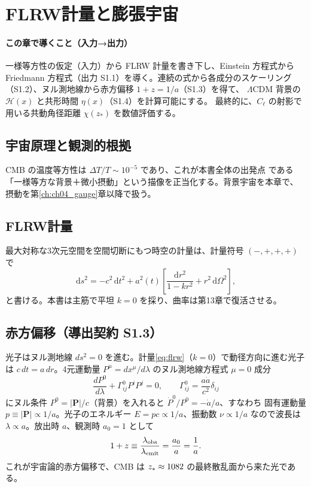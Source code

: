 \section{FLRW計量と膨張宇宙}
\label{ch:ch01_introduction}

\paragraph{この章で導くこと（入力→出力）}
一様等方性の仮定（入力）から FLRW 計量を書き下し、Einstein 方程式から
Friedmann 方程式（出力 S1.1）を導く。連続の式から各成分のスケーリング
（S1.2）、ヌル測地線から赤方偏移 $1+z=1/a$（S1.3）を得て、
$\Lambda$CDM 背景の $\mathcal H(x)$ と共形時間 $\eta(x)$（S1.4）を計算可能にする。
最終的に、$C_\ell$ の射影で用いる共動角径距離 $\chi(z_*)$ を数値評価する。

\subsection{宇宙原理と観測的根拠}
CMB の温度等方性は $\Delta T/T \sim 10^{-5}$ であり、これが本書全体の出発点
である「一様等方な背景＋微小摂動」という描像を正当化する。背景宇宙を本章で、
摂動を第\ref{ch:ch04_gauge}章以降で扱う。

\subsection{FLRW計量}
最大対称な3次元空間を空間切断にもつ時空の計量は、計量符号 $(-,+,+,+)$ で
\begin{equation}
  \mathrm ds^2 = -c^2\,\mathrm dt^2
  + a^2(t)\left[\frac{\mathrm dr^2}{1-k r^2}
  + r^2\,\mathrm d\Omega^2\right],
  \label{eq:flrw}
\end{equation}
と書ける。本書は主筋で平坦 $k=0$ を採り、曲率は第13章で復活させる。

\subsection{赤方偏移（導出契約 S1.3）}
光子はヌル測地線 $ds^2=0$ を進む。計量\eqref{eq:flrw}（$k=0$）で動径方向に進む光子は
$c\,dt=a\,dr$。4元運動量 $P^\mu=dx^\mu/d\lambda$ のヌル測地線方程式 $\mu=0$ 成分
\begin{equation}
  \frac{dP^0}{d\lambda}+\Gamma^0_{ij}P^iP^j=0,\qquad \Gamma^0_{ij}=\frac{a\dot a}{c^2}\delta_{ij}
\end{equation}
にヌル条件 $P^0=|\mathbf P|/c$（背景）を入れると $\dot P^0/P^0=-\dot a/a$、すなわち
固有運動量 $p\equiv|\mathbf P|\propto1/a$。光子のエネルギー $E=pc\propto1/a$、振動数
$\nu\propto1/a$ なので波長は $\lambda\propto a$。放出時 $a$、観測時 $a_0=1$ として
\begin{equation}
  1+z \equiv \frac{\lambda_{\rm obs}}{\lambda_{\rm emit}}=\frac{a_0}{a}=\frac{1}{a}.
\end{equation}
これが宇宙論的赤方偏移で、CMB は $z_*\approx1082$ の最終散乱面から来た光である。

